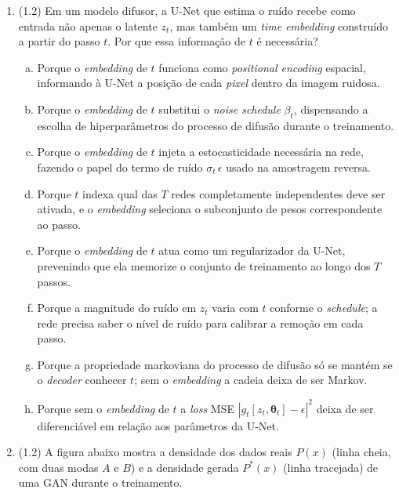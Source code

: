 \documentclass[11pt,a4paper]{article}
\newcommand{\thetav}{\boldsymbol{\theta}}
\begin{document}
\begin{enumerate}[1)]
\item (1.2) Em um modelo difusor, a U-Net que estima o ruído recebe como entrada não apenas o latente $z_t$, mas também um \textit{time embedding} construído a partir do passo $t$. Por que essa informação de $t$ é necessária?
\begin{enumerate}[a)]
    \item Porque o \textit{embedding} de $t$ funciona como \textit{positional encoding} espacial, informando à U-Net a posição de cada \textit{pixel} dentro da imagem ruidosa.
    \item Porque o \textit{embedding} de $t$ substitui o \textit{noise schedule} $\beta_t$, dispensando a escolha de hiperparâmetros do processo de difusão durante o treinamento.
    \item Porque o \textit{embedding} de $t$ injeta a estocasticidade necessária na rede, fazendo o papel do termo de ruído $\sigma_t\,\epsilon$ usado na amostragem reversa.
    \item Porque $t$ indexa qual das $T$ redes completamente independentes deve ser ativada, e o \textit{embedding} seleciona o subconjunto de pesos correspondente ao passo.
    \item Porque o \textit{embedding} de $t$ atua como um regularizador da U-Net, prevenindo que ela memorize o conjunto de treinamento ao longo dos $T$ passos.
    \item Porque a magnitude do ruído em $z_t$ varia com $t$ conforme o \textit{schedule}; a rede precisa saber o nível de ruído para calibrar a remoção em cada passo.
    \item Porque a propriedade markoviana do processo de difusão só se mantém se o \textit{decoder} conhecer $t$; sem o \textit{embedding} a cadeia deixa de ser Markov.
    \item Porque sem o \textit{embedding} de $t$ a \emph{loss} MSE $|g_t[z_t,\thetav_t] - \epsilon|^{2}$ deixa de ser diferenciável em relação aos parâmetros da U-Net.
\end{enumerate}

\item (1.2) A figura abaixo mostra a densidade dos dados reais $P(x)$ (linha cheia, com duas modas $A$ e $B$) e a densidade gerada $P^{*}(x)$ (linha tracejada) de uma GAN durante o treinamento.


\end{enumerate}
\end{document}

